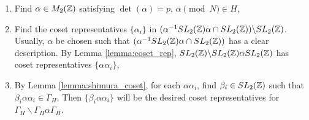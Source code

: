 \begin{enumerate}
    \item Find $\alpha \in M_2(\mathbb{Z})$ satisfying $\det(\alpha) = p$, $\alpha \pmod{N} \in H$,
    \item Find the coset representatives $\{\alpha_i\}$ in $(\alpha^{-1} SL_2(\mathbb{Z}) \alpha \cap  SL_2(\mathbb{Z}))\backslash SL_2(\mathbb{Z})$. Usually, $\alpha$ be chosen such that $(\alpha^{-1} SL_2(\mathbb{Z}) \alpha \cap  SL_2(\mathbb{Z}))$ has a clear description. By Lemma \ref{lemma:coset_rep}, $SL_2(\mathbb{Z})\backslash SL_2(\mathbb{Z}) \alpha SL_2(\mathbb{Z})$ has coset representatives $\{\alpha \alpha_i\}$,
    \item By Lemma \ref{lemma:shimura_coset}, for each $\alpha \alpha_i$, find $\beta_i \in SL_2(\mathbb{Z})$ such that $\beta_i \alpha \alpha_i \in \Gamma_H$. Then $\{ \beta_i \alpha \alpha_i\}$ will be the desired coset representatives for $\Gamma_H \backslash \Gamma_H \alpha \Gamma_H$.
\end{enumerate}

